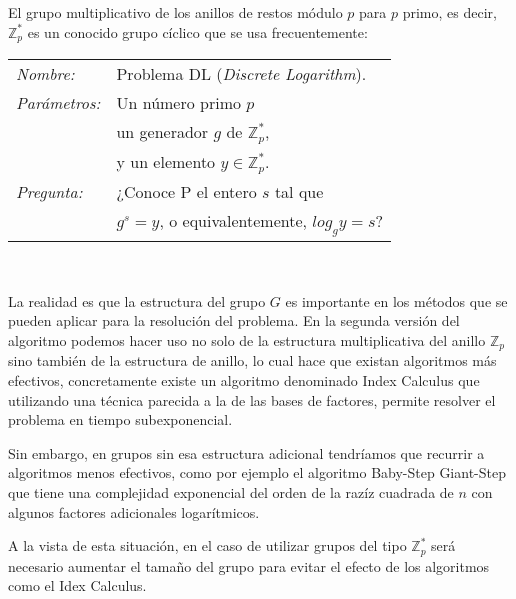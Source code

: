 \hfil

El grupo multiplicativo de los anillos de restos m\'odulo $p$ para $p$ primo, es decir, ${\mathbb Z}^*_p$ es un conocido grupo c\'iclico que se usa frecuentemente:

\hfil

\begin{tabular}{|ll}
	\textit{Nombre:} & Problema DL (\textit{Discrete Logarithm}). \\
	\textit{Parámetros:} & Un n\'umero primo $p$ \\ & un generador $g$ de ${\mathbb Z}_p^*$,\\ & y un elemento $y\in {\mathbb Z}_p^*$. \\
	\textit{Pregunta:} & ¿Conoce P el entero $s$ tal que \\ & $g^s = y$, o equivalentemente, $log_g y = s$? \\
\end{tabular}
\\

\hfil

La realidad es que la estructura del grupo $G$ es importante en los m\'etodos que se pueden aplicar para la resoluci\'on del problema. En la segunda versi\'on del algoritmo
podemos hacer uso no solo de la estructura multiplicativa del anillo ${\mathbb Z}_p$ sino tambi\'en de la estructura de anillo, lo cual hace que existan algoritmos m\'as efectivos,
concretamente existe un algoritmo denominado Index Calculus que utilizando una t\'ecnica parecida a la de las bases de factores, permite resolver el problema en tiempo subexponencial.

Sin embargo, en grupos sin esa estructura adicional tendr\'iamos que recurrir a algoritmos menos efectivos, como por ejemplo el algoritmo Baby-Step Giant-Step que tiene una complejidad
exponencial del orden de la raz\'iz cuadrada de $n$ con algunos factores adicionales logar\'itmicos.

A la vista de esta situaci\'on, en el caso de utilizar grupos del tipo ${\mathbb Z}_p^*$ ser\'a necesario aumentar el tama\~no del grupo para evitar el efecto de los algoritmos
como el Idex Calculus.

